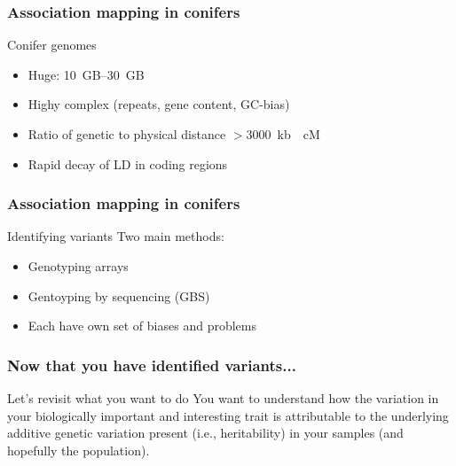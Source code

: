 \begin{frame}
\frametitle{Association mapping in conifers}
\begin{block}{Conifer genomes}
\begin{itemize}
\item{Huge: \SIrange{10}{30}{GB}}
\item{Highy complex (repeats, gene content, GC-bias)}
\item{Ratio of genetic to physical distance $>$\SI{3000}{kb \per cM}}
\item{Rapid decay of LD in coding regions}
\end{itemize}
\end{block}
\tiny
\citet{Uchiyama:2013ci,Hirschhorn:2005cka}
\end{frame}

\begin{frame}
\frametitle{Association mapping in conifers}
\begin{block}{Identifying variants}
Two main methods:
\begin{itemize}
\item{Genotyping arrays}
\item{Gentoyping by sequencing (GBS)}
\item{Each have own set of biases and problems}
\end{itemize}
\end{block}
\end{frame}

\begin{frame}
\frametitle{Now that you have identified variants...}
\begin{block}{Let's revisit what you want to do}
\centering
You want to understand how the variation in your biologically important and
interesting trait is attributable to the underlying additive genetic variation 
present (i.e., heritability) in your samples (and hopefully the population).
\end{block}
\end{frame}

